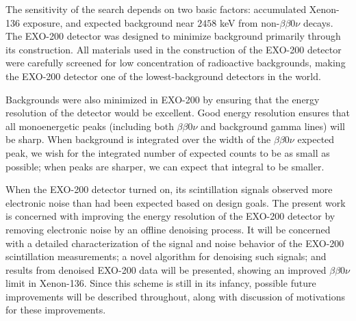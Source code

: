 The sensitivity of the search depends on two basic factors: accumulated Xenon-136 exposure, and expected background near $2458$ keV from non-$\beta\beta 0\nu$ decays.  The EXO-200 detector was designed to minimize background primarily through its construction.  All materials used in the construction of the EXO-200 detector were carefully screened for low concentration of radioactive backgrounds, making the EXO-200 detector one of the lowest-background detectors in the world.

Backgrounds were also minimized in EXO-200 by ensuring that the energy resolution of the detector would be excellent.  Good energy resolution ensures that all monoenergetic peaks (including both $\beta\beta 0\nu$ and background gamma lines) will be sharp.  When background is integrated over the width of the $\beta\beta 0\nu$ expected peak, we wish for the integrated number of expected counts to be as small as possible; when peaks are sharper, we can expect that integral to be smaller.

When the EXO-200 detector turned on, its scintillation signals observed more electronic noise than had been expected based on design goals.  The present work is concerned with improving the energy resolution of the EXO-200 detector by removing electronic noise by an offline denoising process.  It will be concerned with a detailed characterization of the signal and noise behavior of the EXO-200 scintillation measurements; a novel algorithm for denoising such signals; and results from denoised EXO-200 data will be presented, showing an improved $\beta\beta 0\nu$ limit in Xenon-136.  Since this scheme is still in its infancy, possible future improvements will be described throughout, along with discussion of motivations for these improvements.

